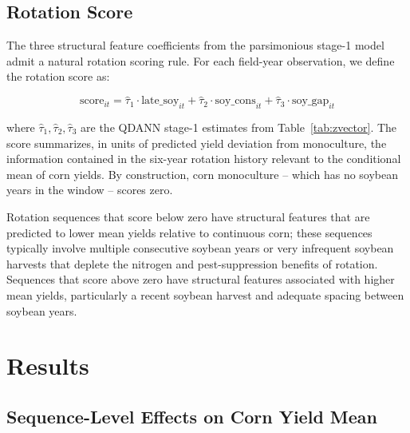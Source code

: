 \documentclass[12pt,letterpaper]{article}
\theoremstyle{remark}
\theoremstyle{remark}
\theoremstyle{plain}
\theoremstyle{definition}
\begin{document}
\subsection{\label{subsec:rot_score}Rotation Score}
The three structural feature coefficients from the parsimonious stage-1 model admit a natural rotation scoring rule. For each field-year observation, we define the rotation score as:

\begin{equation}
    \text{score}_{it} = \hat{\tau}_1 \cdot \text{late\_soy}_{it} + \hat{\tau}_2 \cdot \text{soy\_cons}_{it} + \hat{\tau}_3 \cdot \text{soy\_gap}_{it}\label{eq:score}
\end{equation}

where $\hat{\tau}_1, \hat{\tau}_2, \hat{\tau}_3$ are the QDANN stage-1 estimates from Table~\ref{tab:zvector}. The score summarizes, in units of predicted yield deviation from monoculture, the information contained in the six-year rotation history relevant to the conditional mean of corn yields. By construction, corn monoculture -- which has no soybean years in the window -- scores zero.

Rotation sequences that score below zero have structural features that are predicted to lower mean yields relative to continuous corn; these sequences typically involve multiple consecutive soybean years or very infrequent soybean harvests that deplete
the nitrogen and pest-suppression benefits of rotation. Sequences that score above zero have structural features associated with higher mean yields, particularly a recent soybean harvest and adequate spacing between soybean years.


\section{\label{sec:results}Results}
\subsection{\label{subsec:seq_effects}Sequence-Level Effects on Corn Yield Mean}
 
\end{document}
